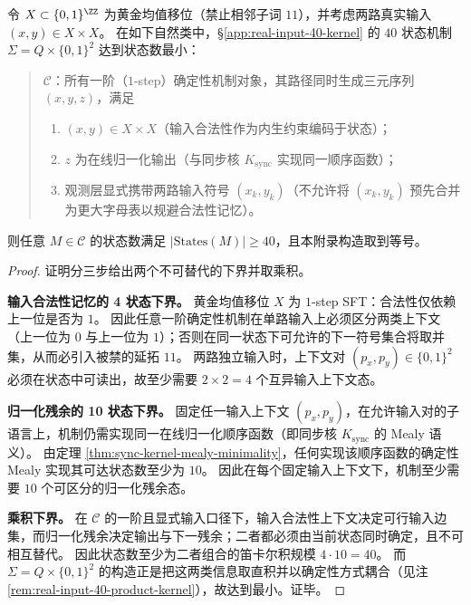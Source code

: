 \begin{theorem}\label{thm:real-input-40-product-lower-bound}
令 \(X\subset\{0,1\}^{\ZZ}\) 为黄金均值移位（禁止相邻子词 \(11\)），并考虑两路真实输入 \((x,y)\in X\times X\)。
在如下自然类中，\S\ref{app:real-input-40-kernel} 的 \(40\) 状态机制 \(\Sigma=Q\times\{0,1\}^2\) 达到状态数最小：
\begin{quote}
\(\mathcal{C}\)：所有一阶（\(1\)-step）确定性机制对象，其路径同时生成三元序列 \((x,y,z)\)，满足
\begin{enumerate}
  \item \((x,y)\in X\times X\)（输入合法性作为内生约束编码于状态）；
  \item \(z\) 为在线归一化输出（与同步核 \(K_{\mathrm{sync}}\) 实现同一顺序函数）；
  \item 观测层显式携带两路输入符号 \((x_k,y_k)\)（不允许将 \((x_k,y_k)\) 预先合并为更大字母表以规避合法性记忆）。
\end{enumerate}
\end{quote}
则任意 \(M\in\mathcal{C}\) 的状态数满足 \(|\mathrm{States}(M)|\ge 40\)，且本附录构造取到等号。
\end{theorem}

\begin{proof}
证明分三步给出两个不可替代的下界并取乘积。
\par
\textbf{输入合法性记忆的 4 状态下界。}
黄金均值移位 \(X\) 为 \(1\)-step SFT：合法性仅依赖上一位是否为 \(1\)。
因此任意一阶确定性机制在单路输入上必须区分两类上下文（上一位为 \(0\) 与上一位为 \(1\)）；否则在同一状态下可允许的下一符号集合将取并集，从而必引入被禁的延拓 \(11\)。
两路独立输入时，上下文对 \((p_x,p_y)\in\{0,1\}^2\) 必须在状态中可读出，故至少需要 \(2\times 2=4\) 个互异输入上下文态。
\par
\textbf{归一化残余的 10 状态下界。}
固定任一输入上下文 \((p_x,p_y)\)，在允许输入对的子语言上，机制仍需实现同一在线归一化顺序函数（即同步核 \(K_{\mathrm{sync}}\) 的 Mealy 语义）。
由定理 \ref{thm:sync-kernel-mealy-minimality}，任何实现该顺序函数的确定性 Mealy 实现其可达状态数至少为 \(10\)。
因此在每个固定输入上下文下，机制至少需要 \(10\) 个可区分的归一化残余态。
\par
\textbf{乘积下界。}
在 \(\mathcal{C}\) 的一阶且显式输入口径下，输入合法性上下文决定可行输入边集，而归一化残余决定输出与下一残余；二者都必须由当前状态同时确定，且不可相互替代。
因此状态数至少为二者组合的笛卡尔积规模 \(4\cdot 10=40\)。
而 \(\Sigma=Q\times\{0,1\}^2\) 的构造正是把这两类信息取直积并以确定性方式耦合（见注 \ref{rem:real-input-40-product-kernel}），故达到最小。证毕。
\end{proof}

\endinput
